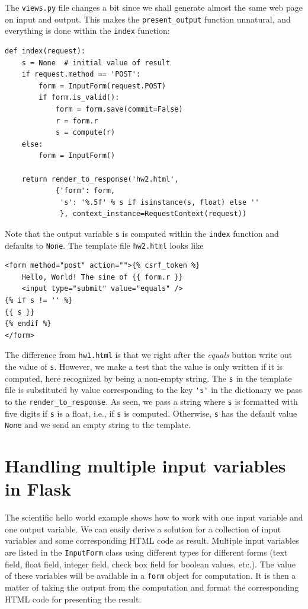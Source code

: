 \documentclass[%
oneside,                 %
final,                   %
10pt]{article}
\begin{document}
{The \Verb!views.py! file changes a bit since we shall generate almost the same
web page on input and output. This makes the \Verb!present_output! function
unnatural, and everything is done within the \Verb!index! function:

\begin{Verbatim}[numbers=none,fontsize=\fontsize{9pt}{9pt},baselinestretch=0.85]
def index(request):
    s = None  # initial value of result
    if request.method == 'POST':
        form = InputForm(request.POST)
        if form.is_valid():
            form = form.save(commit=False)
            r = form.r
            s = compute(r)
    else:
        form = InputForm()

    return render_to_response('hw2.html',
            {'form': form,
             's': '%.5f' % s if isinstance(s, float) else ''
             }, context_instance=RequestContext(request))
\end{Verbatim}

Note that the output variable \Verb!s! is computed within the \Verb!index!
function and defaults to \Verb!None!. The template file \Verb!hw2.html!
looks like

\begin{Verbatim}[numbers=none,fontsize=\fontsize{9pt}{9pt},baselinestretch=0.85]
<form method="post" action="">{% csrf_token %}
    Hello, World! The sine of {{ form.r }}
    <input type="submit" value="equals" />
{% if s != '' %}
{{ s }}
{% endif %}
</form>
\end{Verbatim}
The difference from \Verb!hw1.html! is that we right after the \emph{equals}
button write out the value of \Verb!s!. However, we make a test that
the value is only written if it is computed, here recognized by
being a non-empty string. The \Verb!s! in the template file
is substituted by value corresponding to the key \Verb!'s'! in the
dictionary we pass to the \Verb!render_to_response!. As seen,
we pass a string where \Verb!s! is formatted with five digits if \Verb!s!
is a float, i.e., if \Verb!s! is computed. Otherwise, \Verb!s! has the
default value \Verb!None! and we send an empty string to the template.


\section{Handling multiple input variables in Flask}
\label{wf:vib:flask}

The scientific hello world example shows how to work with one input
variable and one output variable. We can easily derive a solution for
a collection of input variables and some corresponding HTML code
as result. Multiple input variables are listed in the \Verb!InputForm!
class using different types for different forms (text field,
float field, integer field, check box field for boolean values, etc.).
The value of these variables will be available in a \Verb!form! object
for computation. It is then a matter of taking the output from the
computation and format the corresponding HTML code for presenting
the result.

}
\end{document}
